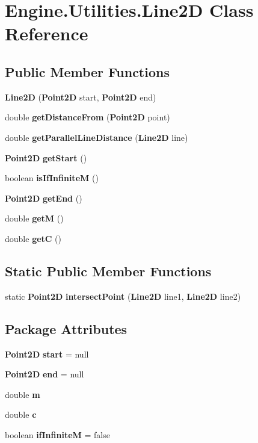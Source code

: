 \section{Engine.Utilities.Line2D Class Reference}
\label{class_engine_1_1_utilities_1_1_line2_d}
\subsection*{Public Member Functions}
\begin{DoxyCompactItemize}
\item 
{\bf Line2D} ({\bf Point2D} start, {\bf Point2D} end)
\item 
double {\bf getDistanceFrom} ({\bf Point2D} point)
\item 
double {\bf getParallelLineDistance} ({\bf Line2D} line)
\item 
{\bf Point2D} {\bf getStart} ()
\item 
boolean {\bf isIfInfiniteM} ()
\item 
{\bf Point2D} {\bf getEnd} ()
\item 
double {\bf getM} ()
\item 
double {\bf getC} ()
\end{DoxyCompactItemize}
\subsection*{Static Public Member Functions}
\begin{DoxyCompactItemize}
\item 
static {\bf Point2D} {\bf intersectPoint} ({\bf Line2D} line1, {\bf Line2D} line2)
\end{DoxyCompactItemize}
\subsection*{Package Attributes}
\begin{DoxyCompactItemize}
\item 
{\bf Point2D} {\bfseries start} = null\label{class_engine_1_1_utilities_1_1_line2_d_a410be554a2596b41ee02c4676a863547}

\item 
{\bf Point2D} {\bfseries end} = null\label{class_engine_1_1_utilities_1_1_line2_d_a1c053dc369de723e0a647e871887423d}

\item 
double {\bfseries m}\label{class_engine_1_1_utilities_1_1_line2_d_a5a16ff0903c1c4d27028e8b97f15353f}

\item 
double {\bfseries c}\label{class_engine_1_1_utilities_1_1_line2_d_a42304f57991970c6937cdd9643b67dd4}

\item 
boolean {\bfseries ifInfiniteM} = false\label{class_engine_1_1_utilities_1_1_line2_d_aa1cf87f0644cca088d7414e0aba3f33b}

\end{DoxyCompactItemize}


